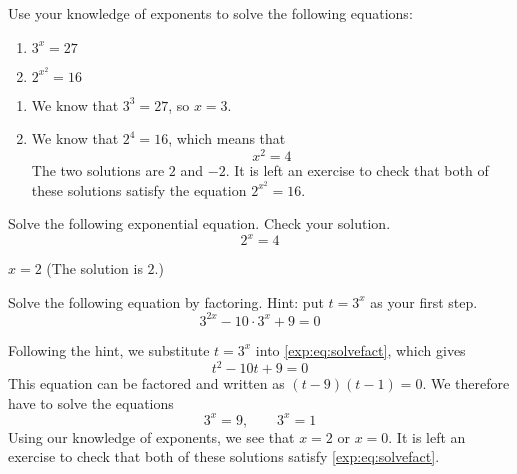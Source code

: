 \begin{pccexample}
	Use your knowledge of exponents to solve the following 
	equations:
	\begin{multicols}{2}
		\begin{enumerate}
			\item $3^{x}=27$
			\item $2^{x^2}=16$
		\end{enumerate}
	\end{multicols}
	\begin{pccsolution}
		\begin{enumerate}
			\item We know that $3^3=27$, so $x=3$.
			\item We know that $2^4=16$, which means that 
			\[
				x^2=4
			\]
			The two solutions are $2$ and $-2$.
			It is left an exercise to check that both of these solutions satisfy the 
			equation $2^{x^2}=16$.
		\end{enumerate}
	\end{pccsolution}
\end{pccexample}
\begin{doyouunderstand}
	\begin{problem}
	Solve the following exponential equation. Check your solution. 
	\[
		2^x=4
	\]
	\begin{shortsolution}
		$x=2$ (The solution is $2$.)
	\end{shortsolution}
	\end{problem}
\end{doyouunderstand}

\begin{pccexample}\label{exp:ex:factor}
	Solve the following equation by factoring. Hint: put $t=3^x$ as 
	your first step.
	\begin{equation}\label{exp:eq:solvefact}
		3^{2x}-10\cdot 3^x+9=0
	\end{equation}
	\begin{pccsolution}
		Following the hint, we substitute $t=3^x$ into \cref{exp:eq:solvefact}, which gives
		\[
			t^2 - 10t +9 = 0
		\]
		This equation can be factored and written as $(t-9)(t-1)=0$. We therefore 
		have to solve the equations
		\[
			3^x = 9, \qquad 3^x = 1
		\]
		Using our knowledge of exponents, we see that $x=2$ or $x=0$. It is left 
		an exercise to check that both of these solutions satisfy \cref{exp:eq:solvefact}.
	\end{pccsolution}
\end{pccexample}

